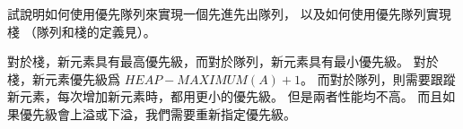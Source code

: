 \startEXERCISE
試說明如何使用優先隊列來實現一個先進先出隊列，
以及如何使用優先隊列實現棧
（隊列和棧的定義見）。
\stopEXERCISE

\startANSWER
對於棧，新元素具有最高優先級，而對於隊列，新元素具有最小優先級。
對於棧，新元素優先級爲 $HEAP-MAXIMUM(A) + 1$。
而對於隊列，則需要跟蹤新元素，每次增加新元素時，都用更小的優先級。
但是兩者性能均不高。
而且如果優先級會上溢或下溢，我們需要重新指定優先級。
\stopANSWER
